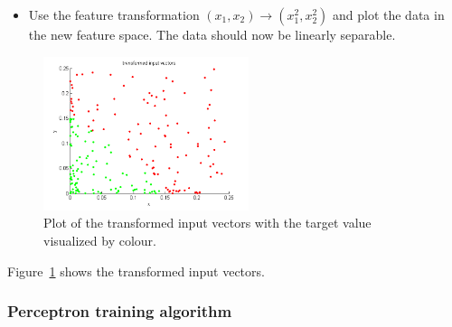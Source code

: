 \documentclass[a4]{article}
\begin{document}
\begin{itemize}
\item Use the feature transformation $(x_1,x_2) \rightarrow (x_1^2,x_2^2)$ and plot the data in the new feature space. The data should now be linearly separable.
\end{itemize}
\begin{figure}[!h]
	\begin{center}
		\centering
		\includegraphics[width=6cm]{../figures/transformedInputVectors.pdf}
	\end{center}
	\caption{Plot of the transformed input vectors with the target value visualized by colour.}
	\label{fig:transformedInputVectors}
\end{figure}
Figure~\ref{fig:transformedInputVectors} shows the transformed input vectors.

\subsubsection{Perceptron training algorithm}
%
%
%
\end{document}
